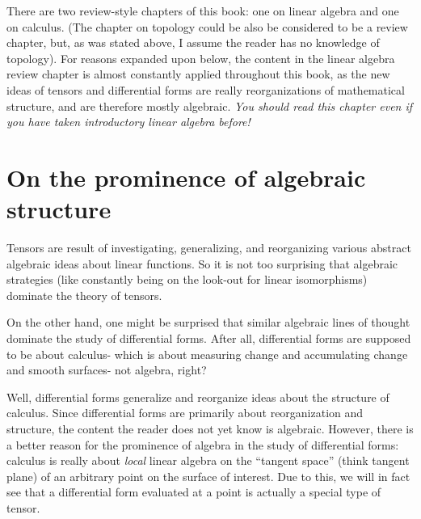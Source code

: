 There are two review-style chapters of this book: one on linear algebra and one on calculus. (The chapter on topology could be also be considered to be a review chapter, but, as was stated above, I assume the reader has no knowledge of topology). For reasons expanded upon below, the content in the linear algebra review chapter is almost constantly applied throughout this book, as the new ideas of tensors and differential forms are really reorganizations of mathematical structure, and are therefore mostly algebraic. \textit{You should read this chapter even if you have taken introductory linear algebra before!}

\section*{On the prominence of algebraic structure}

Tensors are result of investigating, generalizing, and reorganizing various abstract algebraic ideas about linear functions. So it is not too surprising that algebraic strategies (like constantly being on the look-out for linear isomorphisms) dominate the theory of tensors.

On the other hand, one might be surprised that similar algebraic lines of thought dominate the study of differential forms. After all, differential forms are supposed to be about calculus- which is about measuring change and accumulating change and smooth surfaces- not algebra, right?

Well, differential forms generalize and reorganize ideas about the structure of calculus. Since differential forms are primarily about reorganization and structure, the content the reader does not yet know is algebraic. However, there is a better reason for the prominence of algebra in the study of differential forms: calculus is really about \textit{local} linear algebra on the ``tangent space'' (think tangent plane) of an arbitrary point on the  surface of interest. Due to this, we will in fact see that a differential form evaluated at a point is actually a special type of tensor.



